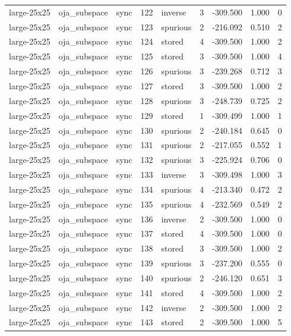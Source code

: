 \begin{tabular}{lllrlrrrr}
large-25x25 & oja\_subspace & sync & 122 & inverse & 3 & -309.500 & 1.000 & 0 \\
large-25x25 & oja\_subspace & sync & 123 & spurious & 2 & -216.092 & 0.510 & 2 \\
large-25x25 & oja\_subspace & sync & 124 & stored & 4 & -309.500 & 1.000 & 2 \\
large-25x25 & oja\_subspace & sync & 125 & stored & 3 & -309.500 & 1.000 & 4 \\
large-25x25 & oja\_subspace & sync & 126 & spurious & 3 & -239.268 & 0.712 & 3 \\
large-25x25 & oja\_subspace & sync & 127 & stored & 3 & -309.500 & 1.000 & 2 \\
large-25x25 & oja\_subspace & sync & 128 & spurious & 3 & -248.739 & 0.725 & 2 \\
large-25x25 & oja\_subspace & sync & 129 & stored & 1 & -309.499 & 1.000 & 1 \\
large-25x25 & oja\_subspace & sync & 130 & spurious & 2 & -240.184 & 0.645 & 0 \\
large-25x25 & oja\_subspace & sync & 131 & spurious & 2 & -217.055 & 0.552 & 1 \\
large-25x25 & oja\_subspace & sync & 132 & spurious & 3 & -225.924 & 0.706 & 0 \\
large-25x25 & oja\_subspace & sync & 133 & inverse & 3 & -309.498 & 1.000 & 3 \\
large-25x25 & oja\_subspace & sync & 134 & spurious & 4 & -213.340 & 0.472 & 2 \\
large-25x25 & oja\_subspace & sync & 135 & spurious & 4 & -232.569 & 0.549 & 2 \\
large-25x25 & oja\_subspace & sync & 136 & inverse & 2 & -309.500 & 1.000 & 0 \\
large-25x25 & oja\_subspace & sync & 137 & stored & 4 & -309.500 & 1.000 & 0 \\
large-25x25 & oja\_subspace & sync & 138 & stored & 3 & -309.500 & 1.000 & 2 \\
large-25x25 & oja\_subspace & sync & 139 & spurious & 3 & -237.200 & 0.555 & 0 \\
large-25x25 & oja\_subspace & sync & 140 & spurious & 2 & -246.120 & 0.651 & 3 \\
large-25x25 & oja\_subspace & sync & 141 & stored & 4 & -309.500 & 1.000 & 2 \\
large-25x25 & oja\_subspace & sync & 142 & inverse & 2 & -309.500 & 1.000 & 2 \\
large-25x25 & oja\_subspace & sync & 143 & stored & 2 & -309.500 & 1.000 & 5 \\

\end{tabular}
